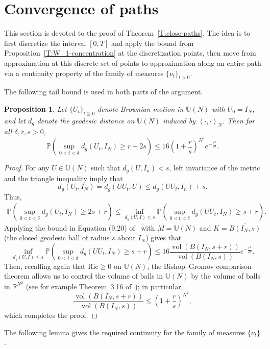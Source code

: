 \documentclass[11pt]{article}
\newtheorem{prop}[theo]{Proposition}
\theoremstyle{definition}
\numberwithin{equation}{section}
\numberwithin{figure}{section}
\numberwithin{table}{section}
\DeclareMathOperator{\vol}{vol}
\newcommand{\Unitary}[1]{\mathbb{U}\left(#1\right)}
\newcommand{\Prob}{\mathbb{P}}
\newcommand{\inprod}[2]{\left\langle #1, #2 \right\rangle}
\begin{document}
\section{Convergence of paths}\label{s.paths}
This section is devoted to the proof of Theorem~\ref{T:close-paths}. The idea is to first discretize the interval $[0,T]$ and apply the bound from Proposition~\ref{T:W_1-concentration} at the discretization points, then move from approximation at this discrete set of points to approximation along an entire path via a continuity property of the family of measures $\{\nu_t\}_{t>0}$.

The following tail bound is used in both parts of the argument.

\begin{prop}\label{T:BM-tail}
Let $\{U_t\}_{t\ge 0}$ denote Brownian motion in $\Unitary{N}$ with $U_0=I_N$, and let $d_g$ denote the geodesic distance on $\Unitary{N}$ induced by $\inprod{\cdot}{\cdot}_N$. Then for all $\delta,r,s>0$,
\[
\Prob\left(\sup_{0<t<\delta}d_g(U_t,I_N)\ge r+2s\right)\le 16\left(1+\frac{r}{s}\right)^{N^2}e^{-\frac{r^2}{2\delta}}.
\]
\end{prop}

\begin{proof}
For any $U\in\mathbb{U}(N)$ such that $d_g(U,I_n)<s$, left invariance of the metric and the triangle inequality imply that
\[
d_g(U_t,I_N)=d_g(UU_t,U)\le d_g(UU_t,I_n)+s.
\]
Thus,
\begin{align*}
\Prob\left(\sup_{0<t<\delta}d_g(U_t,I_N)\ge 2s+r\right) \le
\inf_{d_g(U,I)\le s}\Prob\left(\sup_{0<t<\delta}d_g(UU_t,I_N)\ge s+r\right).
\end{align*}
Applying the bound in Equation (9.20) of~\cite{Grigoryan1999} with $M=\Unitary{N}$ and $K=\overline{B\left(I_N,s\right)}$ (the closed geodesic ball of radius $s$ about $I_N$) gives that
\[
\inf_{d_g(U,I)\le s}\Prob\left(\sup_{0<t<\delta}d_g(UU_t,I_N)\ge s+r\right)\le16\frac{\vol(B\left(I_N,s+r\right))}{\vol(B(I_N,s))}e^{-\frac{r^2}{2\delta}}.
\]
Then, recalling again that $\mathrm{Ric}\ge0$ on $\Unitary{N}$, the Bishop--Gromov comparison theorem allows us to control the volume of balls in $\Unitary{N}$ by the volume of balls in $\mathbb{R}^{N^2}$ (see for example Theorem~3.16 of~\cite{Grove1987}); in particular,
\[
\frac{\vol\left(B\left(I_N,s+r\right)\right)}{\vol\left(B\left(I_N,s\right)\right)}\le
\left(1+\frac{r}{s}\right)^{N^2},
\]
which completes the proof.
\end{proof}

The following lemma gives the required continuity for the family of measures $\{\nu_t\}$.
\end{document}

